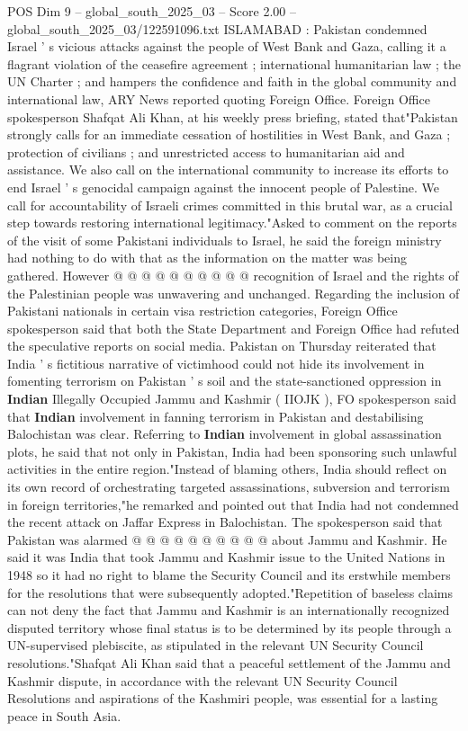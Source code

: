 \begin{textsample}{POS Dim 9 – global\_south\_2025\_03 – Score 2.00 – global\_south\_2025\_03/122591096.txt}  \label{ex:f9_pos_050}
ISLAMABAD : Pakistan condemned Israel ' s vicious attacks against the people of West Bank and Gaza, calling it a flagrant violation of the ceasefire agreement ; international humanitarian law ; the UN Charter ; and hampers the confidence and faith in the global community and international law, ARY News reported quoting Foreign Office.
Foreign Office spokesperson Shafqat Ali Khan, at his weekly press briefing, stated that"Pakistan strongly calls for an immediate cessation of hostilities in West Bank, and Gaza ; protection of civilians ; and unrestricted access to humanitarian aid and assistance.
We also call on the international community to increase its efforts to end Israel ' s genocidal campaign against the innocent people of Palestine.
We call for accountability of Israeli crimes committed in this brutal war, as a crucial step towards restoring international legitimacy."Asked to comment on the reports of the visit of some Pakistani individuals to Israel, he said the foreign ministry had nothing to do with that as the information on the matter was being gathered.
However @ @ @ @ @ @ @ @ @ @ recognition of Israel and the rights of the Palestinian people was unwavering and unchanged.
Regarding the inclusion of Pakistani nationals in certain visa restriction categories, Foreign Office spokesperson said that both the State Department and Foreign Office had refuted the speculative reports on social media.
Pakistan on Thursday reiterated that India ' s fictitious narrative of victimhood could not hide its involvement in fomenting terrorism on Pakistan ' s soil and the state-sanctioned oppression in \textbf{Indian} Illegally Occupied Jammu and Kashmir ( IIOJK ), FO spokesperson said that \textbf{Indian} involvement in fanning terrorism in Pakistan and destabilising Balochistan was clear.
Referring to \textbf{Indian} involvement in global assassination plots, he said that not only in Pakistan, India had been sponsoring such unlawful activities in the entire region."Instead of blaming others, India should reflect on its own record of orchestrating targeted assassinations, subversion and terrorism in foreign territories,"he remarked and pointed out that India had not condemned the recent attack on Jaffar Express in Balochistan.
The spokesperson said that Pakistan was alarmed @ @ @ @ @ @ @ @ @ @ about Jammu and Kashmir.
He said it was India that took Jammu and Kashmir issue to the United Nations in 1948 so it had no right to blame the Security Council and its erstwhile members for the resolutions that were subsequently adopted."Repetition of baseless claims can not deny the fact that Jammu and Kashmir is an internationally recognized disputed territory whose final status is to be determined by its people through a UN-supervised plebiscite, as stipulated in the relevant UN Security Council resolutions."Shafqat Ali Khan said that a peaceful settlement of the Jammu and Kashmir dispute, in accordance with the relevant UN Security Council Resolutions and aspirations of the Kashmiri people, was essential for a lasting peace in South Asia.

\end{textsample}
